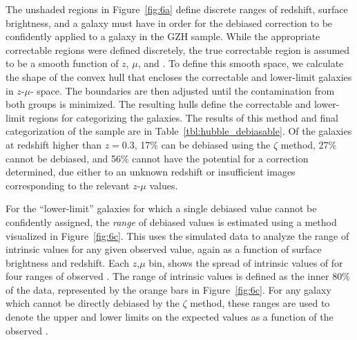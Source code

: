 \documentclass[twocolumn]{aastex6}
\begin{document}
The unshaded regions in Figure~\ref{fig:6a} define discrete ranges of redshift, surface brightness, and \ffeatures{} a galaxy must have in order for the debiased correction to be confidently applied to a galaxy in the GZH sample. While the appropriate correctable regions were defined discretely, the true correctable region is assumed to be a smooth function of $z$, $\mu$, and \ffeatures{}. To define this smooth space, we calculate the shape of the convex hull that encloses the correctable and lower-limit \ferengi{} galaxies in $z$-$\mu$-\ffeatures{} space. The boundaries are then adjusted until the contamination from both groups is minimized. The resulting hulls define the correctable and lower-limit regions for categorizing the \hst{} galaxies. The results of this method and final categorization of the \hst{} sample are in Table~\ref{tbl:hubble_debiasable}. Of the galaxies at redshift higher than $z=0.3$, 17\% can be debiased using the $\zeta$ method, 27\% cannot be debiased, and 56\% cannot have the potential for a correction determined, due either to an unknown redshift or insufficient \ferengi{} images corresponding to the relevant $z$-$\mu$ values.

For the ``lower-limit'' galaxies for which a single debiased \ffeatures{} value cannot be confidently assigned, the \emph{range} of debiased values is estimated using a method visualized in Figure~\ref{fig:6c}. This uses the \ferengi{} simulated data to analyze the range of intrinsic \ffeaturesrest{} values for any given observed \ffeatures{} value, again as a function of surface brightness and redshift. Each $z$,$\mu$ bin, shows the spread of intrinsic values of \ffeaturesrest{} for four ranges of observed \ffeatures. The range of intrinsic values is defined as the inner 80\% of the data, represented by the orange bars in Figure~\ref{fig:6c}. For any galaxy which cannot be directly debiased by the $\zeta$ method, these ranges are used to denote the upper and lower limits on the expected values \ffeaturesrest{} as a function of the observed \ffeatures. 
\end{document}
